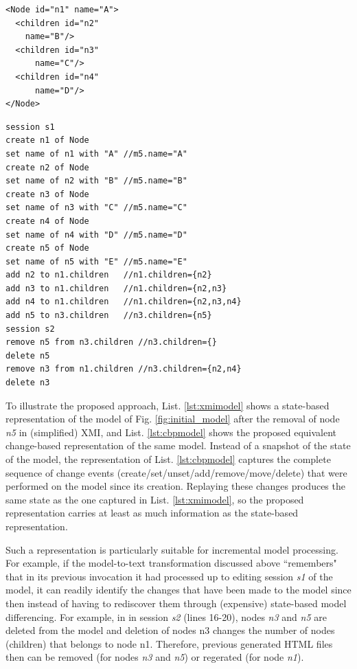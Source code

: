 \documentclass{llncs}
\begin{document}
\noindent
\begin{minipage}[t]{0.34\linewidth}
\begin{lstlisting}[style=xmi,caption={State-based representation of the model of Figure \ref{fig:initial_model} after removal of node \emph{n5} in (simplified) XMI.},label=lst:xmimodel]
<Node id="n1" name="A">
  <children id="n2" 
    name="B"/>
  <children id="n3"
      name="C"/>
  <children id="n4"
      name="D"/>
</Node>
\end{lstlisting}
\end{minipage}
\hfill
\begin{minipage}[t]{0.635\linewidth}
\begin{lstlisting}[style=eol,caption={Change-based representation of the model of Figure \ref{fig:initial_model} after removal of node \emph{n5}.},label=lst:cbpmodel]
session s1
create n1 of Node
set name of n1 with "A" //m5.name="A"
create n2 of Node
set name of n2 with "B" //m5.name="B"
create n3 of Node
set name of n3 with "C" //m5.name="C"
create n4 of Node
set name of n4 with "D" //m5.name="D"
create n5 of Node
set name of n5 with "E" //m5.name="E"
add n2 to n1.children   //n1.children={n2}
add n3 to n1.children   //n1.children={n2,n3}
add n4 to n1.children   //n1.children={n2,n3,n4}
add n5 to n3.children   //n3.children={n5}
session s2
remove n5 from n3.children //n3.children={}
delete n5 
remove n3 from n1.children //n3.children={n2,n4}
delete n3
\end{lstlisting}
\end{minipage}

To illustrate the proposed approach, List. \ref{lst:xmimodel} shows a state-based representation of the model of Fig. \ref{fig:initial_model} after the removal of node \emph{n5} in (simplified) XMI, and List. \ref{lst:cbpmodel} shows the proposed equivalent change-based representation of the same model. Instead of a snapshot of the state of the model, the representation of List. \ref{lst:cbpmodel} captures the complete sequence of change events (create/set/unset/add/remove/move/delete) that were performed on the model since its creation. Replaying these changes produces the same state as the one captured in List. \ref{lst:xmimodel}, so the proposed representation carries at least as much information as the state-based representation.

Such a representation is particularly suitable for incremental model processing. For example, if the model-to-text transformation discussed above ``remembers" that in its previous invocation it had processed up to editing session \emph{s1} of the model, it can readily identify the changes that have been made to the model since then instead of having to rediscover them through (expensive) state-based model differencing. For example, in in session \emph{s2} (lines 16-20), nodes \emph{n3} and \emph{n5} are deleted from the model and deletion of nodes n3 changes the number of nodes (children) that belongs to node {n1}. Therefore, previous generated HTML files then can be removed (for nodes \emph{n3} and \emph{n5}) or regerated (for node \emph{n1}). 
\end{document}
